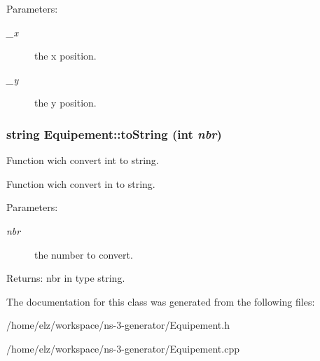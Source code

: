 \begin{Desc}
\item[Parameters:]
\begin{description}
\item[{\em \_\-x}]the x position. \item[{\em \_\-y}]the y position. \end{description}
\end{Desc}
\hypertarget{class_equipement_33973a0f392135d7c50b8ce59fa60941}{
\subsubsection[{toString}]{\setlength{\rightskip}{0pt plus 5cm}string Equipement::toString (int {\em nbr})}}
\label{class_equipement_33973a0f392135d7c50b8ce59fa60941}


Function wich convert int to string. 

Function wich convert in to string.

\begin{Desc}
\item[Parameters:]
\begin{description}
\item[{\em nbr}]the number to convert. \end{description}
\end{Desc}
\begin{Desc}
\item[Returns:]nbr in type string. \end{Desc}


The documentation for this class was generated from the following files:\begin{CompactItemize}
\item 
/home/elz/workspace/ns-3-generator/Equipement.h\item 
/home/elz/workspace/ns-3-generator/Equipement.cpp\end{CompactItemize}

